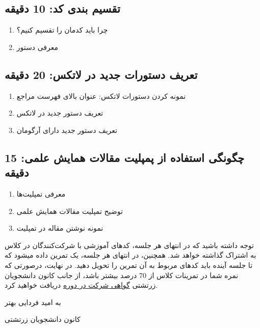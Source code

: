 \documentclass{article}
\begin{document}
\subsection*{تقسیم بندی کد: 10 دقیقه}
\begin{enumerate}
\item چرا باید کدمان را تقسیم کنیم؟
\item معرفی دستور  
\end{enumerate}
\subsection*{تعریف دستورات جدید در لاتکس: 20 دقیقه}
\begin{enumerate}
\item نمونه  کردن دستورات لاتکس: عنوان بالای فهرست مراجع
\item  تعریف دستور جدید در لاتکس
\item تعریف دستور جدید دارای آرگومان
\end{enumerate}
\subsection*{چگونگی استفاده از پمپلیت مقالات همایش علمی: 15 دقیقه}
\begin{enumerate}
\item معرفی تمپلیت‌ها
\item  توضیح تمپلیت مقالات همایش علمی
\item نمونه نوشتن مقاله در تمپلیت
\end{enumerate}



توجه داشته باشید که در انتهای هر جلسه، کدهای آموزشی با شرکت‌کنندگان در کلاس به اشتراک گذاشته خواهد شد. همچنین، در انتهای هر جلسه، یک تمرین داده میشود که تا جلسه آینده باید کدهای مربوط به آن تمرین را تحویل دهید. در نهایت، درصورتی که نمره شما در تمرینات کلاس از 70 درصد بیشتر باشد، از جانب کانون دانشجویان زرتشتی \underline{گواهی شرکت در دوره} دریافت خواهید کرد.

\vspace{5cm}
\begin{center}
به امید فردایی بهتر

کانون دانشجویان زرتشتی
\end{center}
\end{document}
